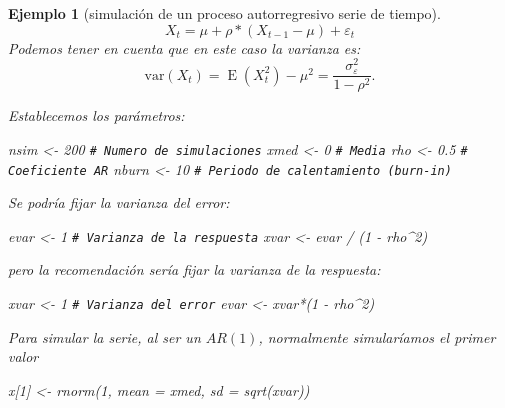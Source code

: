 \documentclass[
]{book}
\newenvironment{Shaded}{\begin{snugshade}}{\end{snugshade}}
\newcommand{\AttributeTok}[1]{\textcolor[rgb]{0.77,0.63,0.00}{#1}}
\newcommand{\CommentTok}[1]{\textcolor[rgb]{0.56,0.35,0.01}{\textit{#1}}}
\newcommand{\DecValTok}[1]{\textcolor[rgb]{0.00,0.00,0.81}{#1}}
\newcommand{\FloatTok}[1]{\textcolor[rgb]{0.00,0.00,0.81}{#1}}
\newcommand{\FunctionTok}[1]{\textcolor[rgb]{0.00,0.00,0.00}{#1}}
\newcommand{\NormalTok}[1]{#1}
\newcommand{\OtherTok}[1]{\textcolor[rgb]{0.56,0.35,0.01}{#1}}
\newcommand{\SpecialCharTok}[1]{\textcolor[rgb]{0.00,0.00,0.00}{#1}}
\theoremstyle{break}
\newtheorem{example}{Ejemplo}[chapter]
\theoremstyle{nonumberplain}
\renewcommand{\CommentTok}[1]{\textcolor[rgb]{0.41,0.41,0.41}{\texttt{#1}}}
\begin{document}
\begin{example}[simulación de un proceso autorregresivo serie de tiempo]

\[X_t = \mu + \rho * (X_{t-1} - \mu) + \varepsilon_t\]
Podemos tener en cuenta que en este caso la varianza es:
\[\textrm{var}(X_t)=\operatorname{E}(X_t^2)-\mu^2=\frac{\sigma_\varepsilon^2}{1-\rho^2}.\]

Establecemos los parámetros:

\begin{Shaded}
\begin{Highlighting}[]
\NormalTok{nsim }\OtherTok{\textless{}{-}} \DecValTok{200}   \CommentTok{\# Numero de simulaciones}
\NormalTok{xmed }\OtherTok{\textless{}{-}} \DecValTok{0}     \CommentTok{\# Media}
\NormalTok{rho }\OtherTok{\textless{}{-}} \FloatTok{0.5}    \CommentTok{\# Coeficiente AR}
\NormalTok{nburn }\OtherTok{\textless{}{-}} \DecValTok{10}   \CommentTok{\# Periodo de calentamiento (burn{-}in)}
\end{Highlighting}
\end{Shaded}

Se podría fijar la varianza del error:

\begin{Shaded}
\begin{Highlighting}[]
\NormalTok{evar }\OtherTok{\textless{}{-}} \DecValTok{1}
\CommentTok{\# Varianza de la respuesta}
\NormalTok{xvar }\OtherTok{\textless{}{-}}\NormalTok{ evar }\SpecialCharTok{/}\NormalTok{ (}\DecValTok{1} \SpecialCharTok{{-}}\NormalTok{ rho}\SpecialCharTok{\^{}}\DecValTok{2}\NormalTok{)}
\end{Highlighting}
\end{Shaded}

pero la recomendación sería fijar la varianza de la respuesta:

\begin{Shaded}
\begin{Highlighting}[]
\NormalTok{xvar }\OtherTok{\textless{}{-}} \DecValTok{1}     
\CommentTok{\# Varianza del error}
\NormalTok{evar }\OtherTok{\textless{}{-}}\NormalTok{ xvar}\SpecialCharTok{*}\NormalTok{(}\DecValTok{1} \SpecialCharTok{{-}}\NormalTok{ rho}\SpecialCharTok{\^{}}\DecValTok{2}\NormalTok{)}
\end{Highlighting}
\end{Shaded}

Para simular la serie, al ser un \(AR(1)\), normalmente simularíamos el primer valor

\begin{Shaded}
\begin{Highlighting}[]
\NormalTok{x[}\DecValTok{1}\NormalTok{] }\OtherTok{\textless{}{-}} \FunctionTok{rnorm}\NormalTok{(}\DecValTok{1}\NormalTok{, }\AttributeTok{mean =}\NormalTok{ xmed, }\AttributeTok{sd =} \FunctionTok{sqrt}\NormalTok{(xvar))}
\end{Highlighting}
\end{Shaded}


\end{example}
\end{document}
